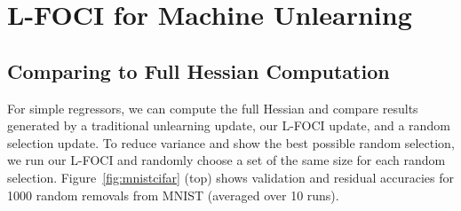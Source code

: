\section{L-FOCI for Machine Unlearning}

\subsection{Comparing to Full Hessian Computation}
For simple regressors, we can compute the full Hessian and compare results generated by a traditional unlearning update, our L-FOCI update, and a random selection update. To reduce variance and show the best possible random selection, we run our L-FOCI and randomly choose a set of the same size for each random selection. Figure~\ref{fig:mnistcifar} (top) shows validation and residual accuracies for 1000 random removals from MNIST (averaged over 10 runs). 

